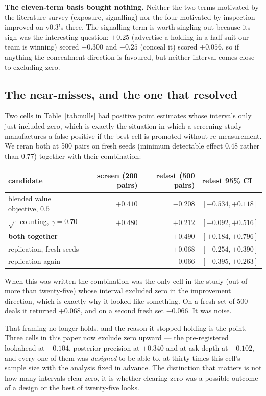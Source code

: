\documentclass[11pt,letterpaper]{article}
\begin{document}
\textbf{The eleven-term basis bought nothing.} Neither the two terms motivated
by the literature survey (exposure, signalling) nor the four motivated by
inspection improved on v0.3's three. The signalling term is worth singling out
because its sign was the interesting question: $+0.25$ (advertise a holding in a
half-suit our team is winning) scored $-0.300$ and $-0.25$ (conceal it) scored
$+0.056$, so if anything the concealment direction is favoured, but neither
interval comes close to excluding zero.

\subsection{The near-misses, and the one that resolved}
\label{sec:res-replication}

Two cells in Table~\ref{tab:nulls} had positive point estimates whose intervals
only just included zero, which is exactly the situation in which a screening
study manufactures a false positive if the best cell is promoted without
re-measurement. We reran both at 500 pairs on fresh seeds (minimum detectable
effect $0.48$ rather than $0.77$) together with their combination:

\begin{center}
\small
\begin{tabular}{lrrl}
\toprule
candidate & screen (200 pairs) & retest (500 pairs) & retest 95\% CI \\
\midrule
blended value objective, $0.5$ & $+0.410$ & $-0.208$ & $[-0.534, +0.118]$ \\
$\sqrt{\cdot}$ counting, $\gamma = 0.70$ & $+0.480$ & $+0.212$ & $[-0.092, +0.516]$ \\
\textbf{both together} & --- & $\mathbf{+0.490}$ & $\mathbf{[+0.184, +0.796]}$ \\
\quad replication, fresh seeds & --- & $+0.068$ & $[-0.254, +0.390]$ \\
\quad replication again & --- & $-0.066$ & $[-0.395, +0.263]$ \\
\bottomrule
\end{tabular}
\end{center}

When this was written the combination was the only cell in the study (out of
more than twenty-five) whose interval excluded zero in the improvement
direction, which is exactly why it looked like something. On a fresh set of 500
deals it returned $+0.068$, and on a second fresh set $-0.066$. It was noise.

That framing no longer holds, and the reason it stopped holding is the point.
Three cells in this paper now exclude zero upward --- the pre-registered
lookahead at $+0.104$, posterior precision at $+0.340$ and at-ask depth at
$+0.102$, and every one of them was \emph{designed} to be able to, at thirty
times this cell's sample size with the analysis fixed in advance. The
distinction that matters is not how many intervals clear zero, it is whether
clearing zero was a possible outcome of a design or the best of twenty-five
looks.
\end{document}
